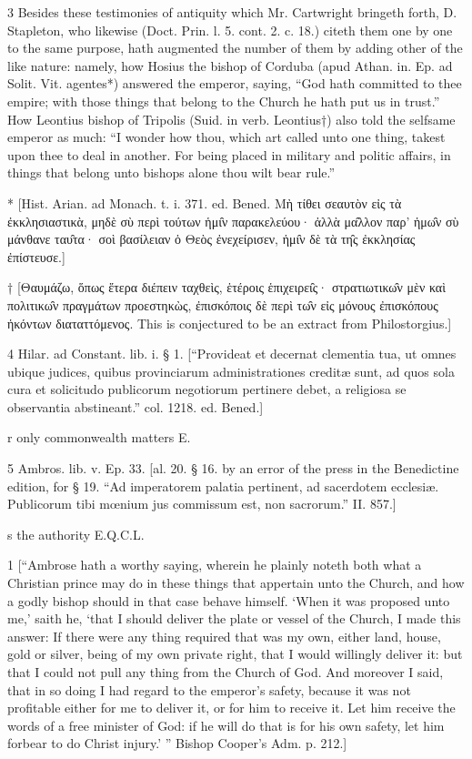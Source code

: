 3
Besides these testimonies of antiquity which Mr. Cartwright bringeth forth, D. Stapleton, who likewise (Doct. Prin. l. 5. cont. 2. c. 18.) citeth them one by one to the same purpose, hath augmented the number of them by adding other of the like nature: namely, how Hosius the bishop of Corduba (apud Athan. in. Ep. ad Solit. Vit. agentes*) answered the emperor, saying, “God hath committed to thee empire; with those things that belong to the Church he hath put us in trust.” How Leontius bishop of Tripolis (Suid. in verb. Leontius†) also told the selfsame emperor as much: “I wonder how thou, which art called unto one thing, takest upon thee to deal in another. For being placed in military and politic affairs, in things that belong unto bishops alone thou wilt bear rule.”

*
[Hist. Arian. ad Monach. t. i. 371. ed. Bened. Μὴ τίθει σεαυτὸν εἰς τὰ ἐκκλησιαστικὰ, μηδὲ σὺ περὶ τούτων ἡμι̑ν παρακελεύου· ἀλλὰ μα̑λλον παρ’ ἡμω̑ν σὺ μάνθανε ταυ̑τα· σοὶ βασίλειαν ὁ Θεὸς ἐνεχείρισεν, ἡμι̑ν δὲ τὰ τη̑ς ἐκκλησίας ἐπίστευσε.]

†
[Θαυμάζω, ὅπως ἕτερα διέπειν ταχθεὶς, ἑτέροις ἑπιχειρει̑ς· στρατιωτικω̑ν μὲν καὶ πολιτικω̑ν πραγμάτων προεστηκὼς, ἐπισκόποις δὲ περὶ τω̑ν εἰς μόνους ἐπισκόπους ἡκόντων διαταττόμενος. This is conjectured to be an extract from Philostorgius.]

4
Hilar. ad Constant. lib. i. § 1. [“Provideat et decernat clementia tua, ut omnes ubique judices, quibus provinciarum administrationes creditæ sunt, ad quos sola cura et solicitudo publicorum negotiorum pertinere debet, a religiosa se observantia abstineant.” col. 1218. ed. Bened.]

r
only commonwealth matters E.

5
Ambros. lib. v. Ep. 33. [al. 20. § 16. by an error of the press in the Benedictine edition, for § 19. “Ad imperatorem palatia pertinent, ad sacerdotem ecclesiæ. Publicorum tibi mœnium jus commissum est, non sacrorum.” II. 857.]

s
the authority E.Q.C.L.

1
[“Ambrose hath a worthy saying, wherein he plainly noteth both what a Christian prince may do in these things that appertain unto the Church, and how a godly bishop should in that case behave himself. ‘When it was proposed unto me,’ saith he, ‘that I should deliver the plate or vessel of the Church, I made this answer: If there were any thing required that was my own, either land, house, gold or silver, being of my own private right, that I would willingly deliver it: but that I could not pull any thing from the Church of God. And moreover I said, that in so doing I had regard to the emperor’s safety, because it was not profitable either for me to deliver it, or for him to receive it. Let him receive the words of a free minister of God: if he will do that is for his own safety, let him forbear to do Christ injury.’ ” Bishop Cooper’s Adm. p. 212.]


